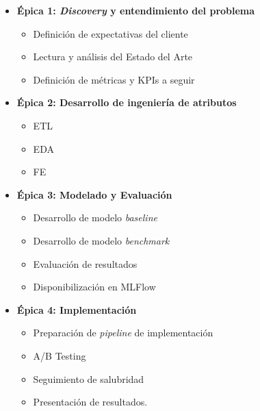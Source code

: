\documentclass[
11pt, %
]{charter}
\begin{document}
\begin{itemize}
  \item \textbf{\'{E}pica 1: \textit{Discovery} y entendimiento del problema}
    \begin{itemize}
      \item Definición de expectativas del cliente  
      \item Lectura y análisis del Estado del Arte
      \item Definición de métricas y KPIs a seguir
    \end{itemize}
  \item \textbf{\'{E}pica 2: Desarrollo de ingeniería de atributos}
    \begin{itemize}
      \item ETL
      \item EDA
      \item FE 
    \end{itemize}
  \item \textbf{\'{E}pica 3: Modelado y Evaluación}
    \begin{itemize}
      \item Desarrollo de modelo \textit{baseline}
      \item Desarrollo de modelo \textit{benchmark}
      \item Evaluación de resultados
      \item Disponibilización en MLFlow
    \end{itemize}
  \item \textbf{\'{E}pica 4: Implementación}
    \begin{itemize}
      \item Preparación de \textit{pipeline} de implementación
      \item A/B Testing
      \item Seguimiento de salubridad
      \item Presentación de resultados.
    \end{itemize}
\end{itemize}
\end{document}
